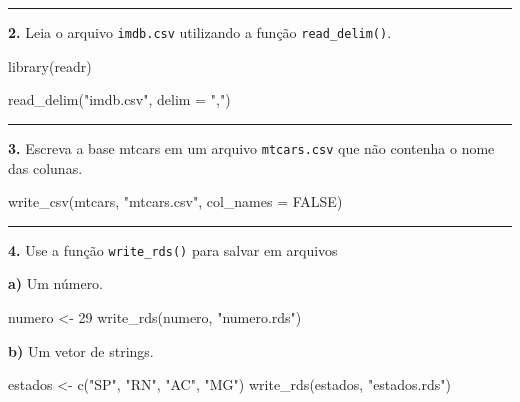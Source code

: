 \documentclass[
]{book}
\newenvironment{Shaded}{\begin{snugshade}}{\end{snugshade}}
\newcommand{\AttributeTok}[1]{\textcolor[rgb]{0.77,0.63,0.00}{#1}}
\newcommand{\ConstantTok}[1]{\textcolor[rgb]{0.00,0.00,0.00}{#1}}
\newcommand{\DecValTok}[1]{\textcolor[rgb]{0.00,0.00,0.81}{#1}}
\newcommand{\FunctionTok}[1]{\textcolor[rgb]{0.00,0.00,0.00}{#1}}
\newcommand{\NormalTok}[1]{#1}
\newcommand{\OtherTok}[1]{\textcolor[rgb]{0.56,0.35,0.01}{#1}}
\newcommand{\StringTok}[1]{\textcolor[rgb]{0.31,0.60,0.02}{#1}}
\begin{document}
\begin{center}\rule{0.5\linewidth}{0.5pt}\end{center}

\textbf{2.} Leia o arquivo \texttt{imdb.csv} utilizando a função \texttt{read\_delim()}.

\begin{Shaded}
\begin{Highlighting}[]
\FunctionTok{library}\NormalTok{(readr)}

\FunctionTok{read\_delim}\NormalTok{(}\StringTok{"imdb.csv"}\NormalTok{, }\AttributeTok{delim =} \StringTok{","}\NormalTok{)}
\end{Highlighting}
\end{Shaded}

\begin{center}\rule{0.5\linewidth}{0.5pt}\end{center}

\textbf{3.} Escreva a base mtcars em um arquivo \texttt{mtcars.csv} que não contenha o nome das colunas.

\begin{Shaded}
\begin{Highlighting}[]
\FunctionTok{write\_csv}\NormalTok{(mtcars, }\StringTok{"mtcars.csv"}\NormalTok{, }\AttributeTok{col\_names =} \ConstantTok{FALSE}\NormalTok{)}
\end{Highlighting}
\end{Shaded}

\begin{center}\rule{0.5\linewidth}{0.5pt}\end{center}

\textbf{4.} Use a função \texttt{write\_rds()} para salvar em arquivos

\textbf{a)} Um número.

\begin{Shaded}
\begin{Highlighting}[]
\NormalTok{numero }\OtherTok{\textless{}{-}} \DecValTok{29}
\FunctionTok{write\_rds}\NormalTok{(numero, }\StringTok{"numero.rds"}\NormalTok{)}
\end{Highlighting}
\end{Shaded}

\textbf{b)} Um vetor de strings.

\begin{Shaded}
\begin{Highlighting}[]
\NormalTok{estados }\OtherTok{\textless{}{-}} \FunctionTok{c}\NormalTok{(}\StringTok{"SP"}\NormalTok{, }\StringTok{"RN"}\NormalTok{, }\StringTok{"AC"}\NormalTok{, }\StringTok{"MG"}\NormalTok{)}
\FunctionTok{write\_rds}\NormalTok{(estados, }\StringTok{"estados.rds"}\NormalTok{)}
\end{Highlighting}
\end{Shaded}
\end{document}
